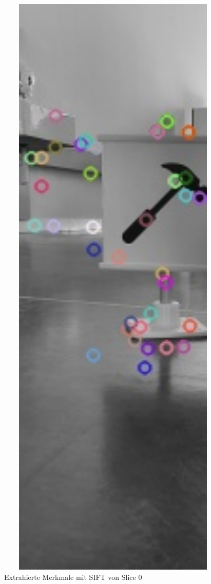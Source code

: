 \begin{figure}[H]
\begin{minipage}[t]{0.22\linewidth}
  \caption{Extrahierte Merkmale mit SIFT von Slice 0}
  \label{fig:slice0-kp2}
  \end{minipage} 
  \hfill
  \begin{minipage}[t]{0.22\linewidth}
  \includegraphics[width=1.0\textwidth]{img/piktogrammerkennung/slice1_kp2.jpg}

\end{minipage}
\end{figure}

